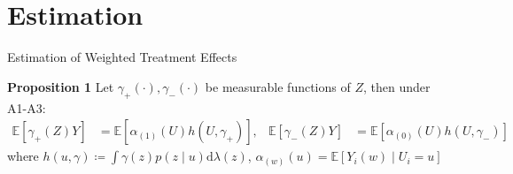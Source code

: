 \section{Estimation}

 \frame{\sectionpage}

    \begin{frame}{Estimation of Weighted Treatment Effects}
        \begin{block}{\textbf{Proposition 1}}
            \small
            Let $\gamma_{+}(\cdot),\gamma_{-}(\cdot)$ be measurable functions of $Z$, then under A1-A3:
            \begin{align*}
                \mathbb{E}\left[\gamma_{+}\left(Z\right)Y\right]&=\mathbb{E}\left[\alpha_{\left(1\right)}\left(U\right)h\left(U,\gamma_{+}\right)\right], & \mathbb{E}\left[\gamma_{-}\left(Z\right)Y\right]&=\mathbb{E}\left[\alpha_{\left(0\right)}\left(U\right)h\left(U,\gamma_{-}\right)\right]
            \end{align*}
            where $h\left(u,\gamma\right)\coloneqq\int\gamma\left(z\right)p\left(z\mid u\right)\mathrm{d}\lambda\left(z\right)$, $\alpha_{\left(w\right)}\left(u\right)=\mathbb{E}\left[Y_{i}\left(w\right)\mid U_{i}=u\right]$
        \end{block}

        


    \end{frame}
